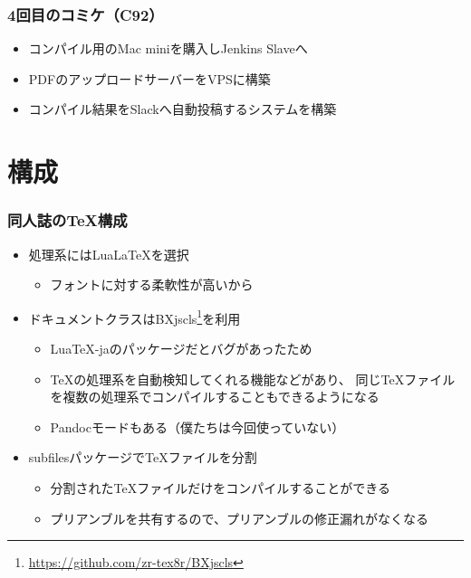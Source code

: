 \begin{frame}
  \frametitle{4回目のコミケ（C92）}

  \begin{itemize}
    \item<2-> コンパイル用のMac miniを購入しJenkins Slaveへ
    \item<3-> PDFのアップロードサーバーをVPSに構築
    \item<4-> コンパイル結果をSlackへ自動投稿するシステムを構築
  \end{itemize}

  \begin{center}
  \end{center}
\end{frame}

\section{構成}

\begin{frame}
  \frametitle{同人誌の\TeX 構成}

  \begin{itemize}
    \item<2-> 処理系にはLua\LaTeX を選択
    \begin{itemize}
      \item フォントに対する柔軟性が高いから
    \end{itemize}

    \item<3-> ドキュメントクラスはBXjscls\footnote[frame]{\url{https://github.com/zr-tex8r/BXjscls}}を利用
    \begin{itemize}
      \item Lua\TeX-jaのパッケージだとバグがあったため
      \item \TeX の処理系を自動検知してくれる機能などがあり、
      同じ\TeX ファイルを複数の処理系でコンパイルすることもできるようになる
      \item Pandocモードもある（僕たちは今回使っていない）
    \end{itemize}

    \item<4-> subfilesパッケージで\TeX ファイルを分割
    \begin{itemize}
      \item 分割された\TeX ファイルだけをコンパイルすることができる
      \item プリアンブルを共有するので、プリアンブルの修正漏れがなくなる
    \end{itemize}
  \end{itemize}
\end{frame}

